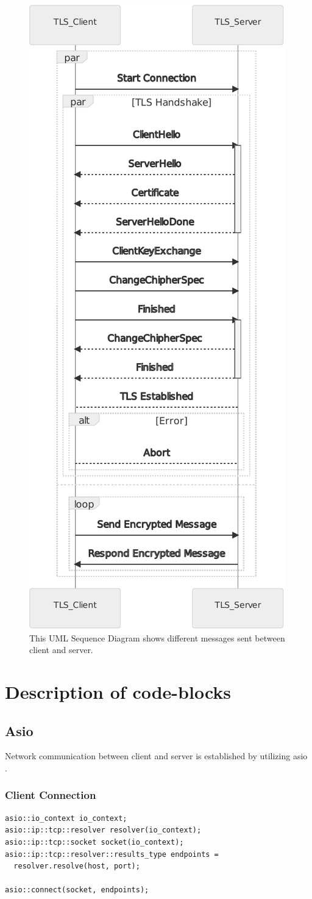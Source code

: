 \documentclass[12pt, letterpaper]{article}
\newenvironment{code}{\captionsetup{type=listing}}{}
\begin{document}
\begin{figure}[H]
	\centering
	\includegraphics[width=.5\textwidth]{UML/Interaction}
	\caption{This UML Sequence Diagram shows different messages sent between client and server.}
	\label{fig:Interaction}
\end{figure}


\section{Description of code-blocks}


\subsection{Asio}
Network communication between client and server is established by utilizing asio \cite{asio}.

\subsubsection{Client Connection}

\begin{code}
	\begin{verbatim}
asio::io_context io_context;
asio::ip::tcp::resolver resolver(io_context);
asio::ip::tcp::socket socket(io_context);
asio::ip::tcp::resolver::results_type endpoints = 
  resolver.resolve(host, port);

asio::connect(socket, endpoints);

	\end{verbatim}
	\caption{Creation of socket connection on client side.}
	\label{clientConnection}
\end{code}
\end{document}
